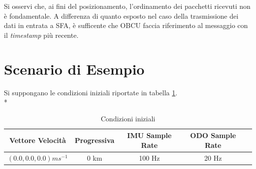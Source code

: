 Si osservi che, ai fini del posizionamento, l'ordinamento dei pacchetti ricevuti non \`e fondamentale. A differenza di quanto esposto nel caso della trasmissione dei dati in entrata a SFA, \`e sufficente che OBCU faccia riferimento al messaggio con il \emph{timestamp} pi\`u recente.
\section{Scenario di Esempio}
Si suppongano le condizioni iniziali riportate in tabella \ref{tab:condinit}.\\*
\begin{table}[h]
	\centering
	\begin{tabular}{|c|c|c|c|c|}
		\hline 
		\textbf{Vettore Velocit\`a} & \textbf{Progressiva} & \textbf{IMU Sample Rate} & \textbf{ODO Sample Rate} \\ 
		\hline 
		$(0.0, 0.0, 0.0) ms^{-1}$ & 0 km & 100 Hz & 20 Hz \\ 
		\hline 
	\end{tabular} 
	\caption{Condizioni iniziali}
	\label{tab:condinit}
\end{table}
